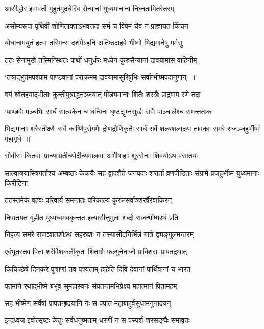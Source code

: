\twolineshloka
{आसीद्धोर इवावर्तो मुहूर्तमुदधेरिव}
{सैन्यानां युध्यमानानां निघ्नतामितरेतरम्}


\twolineshloka
{असौम्यरूपा पृथिवी शोणिताक्ताऽभवत्तदा}
{समं च विषमं चैव न प्राज्ञायत किंचन}


\twolineshloka
{योधानामयुतं हत्वा तस्मिन्स दशमेऽहनि}
{अतिष्ठदाहवे भीष्मो भिद्यमानेषु मर्मसु}


\twolineshloka
{ततः सेनामुखे तस्मिन्स्थितः पार्थो धनुर्धरः}
{मध्येन कुरुसैन्यानां द्रावयामास वाहिनीम्}


\twolineshloka
{`तत्राद्भुतमपश्याम पाण्डवानां पराक्रमम्}
{द्रावयामासुरिषुभिः सर्वान्भीष्मपदानुगान् ॥'}


\twolineshloka
{वयं श्वेतहयाद्भीताः कुन्तीपुत्राद्धनञ्जयात्}
{पीड्यमानाः शितैः शस्त्रैः प्राद्रवाम रणे तदा}


\twolineshloka
{`पाण्डवैः पञ्चभिः सार्धं सात्यकेन च धन्विना}
{धृष्टद्युम्नसुखैः सर्वैः पाञ्चालैश्च समन्ततःक}


\threelineshloka
{भिद्यमानाः शरैस्तीक्ष्णैः सर्वे कार्ष्णिपुरोगमैः}
{द्रोणद्रौणिकृतैः सार्धं सर्वे शल्यशलादयः}
{तावकाः समरे राजञ्जहुर्भीष्मं महामृधे ॥'}


\twolineshloka
{सौवीराः कितवाः प्राच्याःप्रतीच्योदीच्यमालवाः}
{अभीषाहाः शूरसेनाः शिबयोऽथ वसातयः}


\threelineshloka
{साल्वाश्रयास्त्रिगर्ताश्च अम्बष्ठाः केकयैः सह}
{द्वादशैते जनपदाः शरार्ता व्रणपीडिताः}
{संग्रामे प्रजहुर्भीष्मं युध्यमानाः किरीटिना}


\twolineshloka
{ततस्तमेकं बहवः परिवार्य समन्ततः}
{परिकाल्य कुरून्सर्वाञ्शरर्षैरवाकिरन्}


\twolineshloka
{निपातयत गृह्णीत युध्यध्वमवकृन्तत}
{इत्यासीत्तुमुलः शब्दो राजन्भीष्मरथं प्रति}


\twolineshloka
{निहत्य समरे राजञ्शतशोऽथ सहस्रशः}
{न तस्यासीदनिर्भिन्नं गात्रे द्व्यङ्गुलमन्तरम्}


\twolineshloka
{एवंभूतस्तव पिता शरैर्विशकलीकृतः}
{शिताग्रैः फल्गुनेनाजौ प्राक्शिराः प्रापतद्रथात्}


\twolineshloka
{किंचिच्छेषे दिनकरे पुत्राणां तव पश्यताम्}
{हाहेति दिवि देवानां पार्थिवानां च भारत}


\twolineshloka
{पतमाने रथाद्भीष्मे बभूव सुमहास्वनः}
{संपतन्तमभिप्रेक्ष्य महात्मानं पितामहम्}


\twolineshloka
{सह भीष्मेण सर्वेषां प्रापतन्हृदयानि नः}
{स पपात महाबाहुर्वसुधामनुनादयन्}


\twolineshloka
{इन्द्रध्वज इवोत्सृष्टः केतुः सर्वधनुष्मताम्}
{धरणीं न स पस्पर्श शरसङ्घैः समावृतः}


